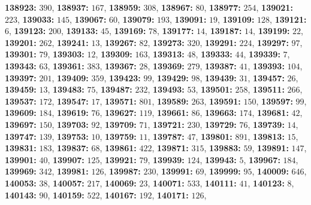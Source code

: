 \textsf{\bfseries 138923:} $390$, \textsf{\bfseries 138937:} $167$, \textsf{\bfseries 138959:} $308$, \textsf{\bfseries 138967:} $80$, \textsf{\bfseries 138977:} $254$, \textsf{\bfseries 139021:} $223$, \textsf{\bfseries 139033:} $145$, \textsf{\bfseries 139067:} $60$, \textsf{\bfseries 139079:} $193$, \textsf{\bfseries 139091:} $19$, \textsf{\bfseries 139109:} $128$, \textsf{\bfseries 139121:} $6$, \textsf{\bfseries 139123:} $200$, \textsf{\bfseries 139133:} $45$, \textsf{\bfseries 139169:} $78$, \textsf{\bfseries 139177:} $14$, \textsf{\bfseries 139187:} $14$, \textsf{\bfseries 139199:} $22$, \textsf{\bfseries 139201:} $262$, \textsf{\bfseries 139241:} $13$, \textsf{\bfseries 139267:} $82$, \textsf{\bfseries 139273:} $320$, \textsf{\bfseries 139291:} $224$, \textsf{\bfseries 139297:} $97$, \textsf{\bfseries 139301:} $79$, \textsf{\bfseries 139303:} $12$, \textsf{\bfseries 139309:} $163$, \textsf{\bfseries 139313:} $48$, \textsf{\bfseries 139333:} $44$, \textsf{\bfseries 139339:} $7$, \textsf{\bfseries 139343:} $63$, \textsf{\bfseries 139361:} $383$, \textsf{\bfseries 139367:} $28$, \textsf{\bfseries 139369:} $279$, \textsf{\bfseries 139387:} $41$, \textsf{\bfseries 139393:} $104$, \textsf{\bfseries 139397:} $201$, \textsf{\bfseries 139409:} $359$, \textsf{\bfseries 139423:} $99$, \textsf{\bfseries 139429:} $98$, \textsf{\bfseries 139439:} $31$, \textsf{\bfseries 139457:} $26$, \textsf{\bfseries 139459:} $13$, \textsf{\bfseries 139483:} $75$, \textsf{\bfseries 139487:} $232$, \textsf{\bfseries 139493:} $53$, \textsf{\bfseries 139501:} $258$, \textsf{\bfseries 139511:} $266$, \textsf{\bfseries 139537:} $172$, \textsf{\bfseries 139547:} $17$, \textsf{\bfseries 139571:} $801$, \textsf{\bfseries 139589:} $263$, \textsf{\bfseries 139591:} $150$, \textsf{\bfseries 139597:} $99$, \textsf{\bfseries 139609:} $184$, \textsf{\bfseries 139619:} $76$, \textsf{\bfseries 139627:} $119$, \textsf{\bfseries 139661:} $86$, \textsf{\bfseries 139663:} $174$, \textsf{\bfseries 139681:} $42$, \textsf{\bfseries 139697:} $150$, \textsf{\bfseries 139703:} $92$, \textsf{\bfseries 139709:} $71$, \textsf{\bfseries 139721:} $230$, \textsf{\bfseries 139729:} $76$, \textsf{\bfseries 139739:} $14$, \textsf{\bfseries 139747:} $139$, \textsf{\bfseries 139753:} $10$, \textsf{\bfseries 139759:} $11$, \textsf{\bfseries 139787:} $47$, \textsf{\bfseries 139801:} $891$, \textsf{\bfseries 139813:} $15$, \textsf{\bfseries 139831:} $183$, \textsf{\bfseries 139837:} $68$, \textsf{\bfseries 139861:} $422$, \textsf{\bfseries 139871:} $315$, \textsf{\bfseries 139883:} $59$, \textsf{\bfseries 139891:} $147$, \textsf{\bfseries 139901:} $40$, \textsf{\bfseries 139907:} $125$, \textsf{\bfseries 139921:} $79$, \textsf{\bfseries 139939:} $124$, \textsf{\bfseries 139943:} $5$, \textsf{\bfseries 139967:} $184$, \textsf{\bfseries 139969:} $342$, \textsf{\bfseries 139981:} $126$, \textsf{\bfseries 139987:} $230$, \textsf{\bfseries 139991:} $69$, \textsf{\bfseries 139999:} $95$, \textsf{\bfseries 140009:} $646$, \textsf{\bfseries 140053:} $38$, \textsf{\bfseries 140057:} $217$, \textsf{\bfseries 140069:} $23$, \textsf{\bfseries 140071:} $533$, \textsf{\bfseries 140111:} $41$, \textsf{\bfseries 140123:} $8$, \textsf{\bfseries 140143:} $90$, \textsf{\bfseries 140159:} $522$, \textsf{\bfseries 140167:} $192$, \textsf{\bfseries 140171:} $126$, 
